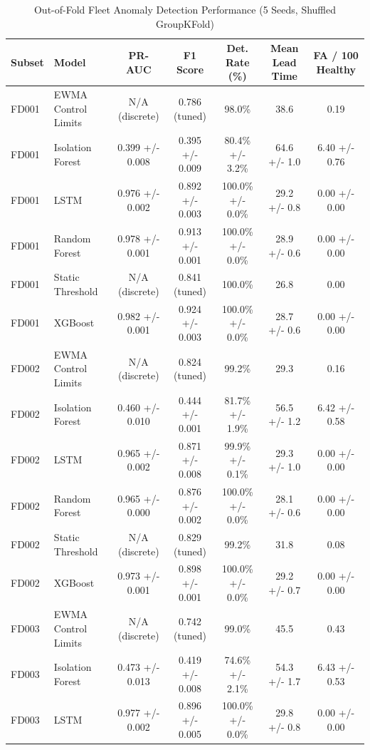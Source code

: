 \begin{table}[t!]
\centering
\small
\caption{Out-of-Fold Fleet Anomaly Detection Performance (5 Seeds, Shuffled GroupKFold)}
\label{tab:anomaly_metrics_oof}
\begin{tabular}{llccccc}
\toprule
\textbf{Subset} & \textbf{Model} & \textbf{PR-AUC} & \textbf{F1 Score} & \textbf{Det. Rate (\%)} & \textbf{Mean Lead Time} & \textbf{FA / 100 Healthy} \\
\midrule
FD001 & EWMA Control Limits & N/A (discrete) & 0.786 (tuned) & 98.0\% & 38.6 & 0.19 \\
FD001 & Isolation Forest & 0.399 +/- 0.008 & 0.395 +/- 0.009 & 80.4\% +/- 3.2\% & 64.6 +/- 1.0 & 6.40 +/- 0.76 \\
FD001 & LSTM & 0.976 +/- 0.002 & 0.892 +/- 0.003 & 100.0\% +/- 0.0\% & 29.2 +/- 0.8 & 0.00 +/- 0.00 \\
FD001 & Random Forest & 0.978 +/- 0.001 & 0.913 +/- 0.001 & 100.0\% +/- 0.0\% & 28.9 +/- 0.6 & 0.00 +/- 0.00 \\
FD001 & Static Threshold & N/A (discrete) & 0.841 (tuned) & 100.0\% & 26.8 & 0.00 \\
FD001 & XGBoost & 0.982 +/- 0.001 & 0.924 +/- 0.003 & 100.0\% +/- 0.0\% & 28.7 +/- 0.6 & 0.00 +/- 0.00 \\
\midrule
FD002 & EWMA Control Limits & N/A (discrete) & 0.824 (tuned) & 99.2\% & 29.3 & 0.16 \\
FD002 & Isolation Forest & 0.460 +/- 0.010 & 0.444 +/- 0.001 & 81.7\% +/- 1.9\% & 56.5 +/- 1.2 & 6.42 +/- 0.58 \\
FD002 & LSTM & 0.965 +/- 0.002 & 0.871 +/- 0.008 & 99.9\% +/- 0.1\% & 29.3 +/- 1.0 & 0.00 +/- 0.00 \\
FD002 & Random Forest & 0.965 +/- 0.000 & 0.876 +/- 0.002 & 100.0\% +/- 0.0\% & 28.1 +/- 0.6 & 0.00 +/- 0.00 \\
FD002 & Static Threshold & N/A (discrete) & 0.829 (tuned) & 99.2\% & 31.8 & 0.08 \\
FD002 & XGBoost & 0.973 +/- 0.001 & 0.898 +/- 0.001 & 100.0\% +/- 0.0\% & 29.2 +/- 0.7 & 0.00 +/- 0.00 \\
\midrule
FD003 & EWMA Control Limits & N/A (discrete) & 0.742 (tuned) & 99.0\% & 45.5 & 0.43 \\
FD003 & Isolation Forest & 0.473 +/- 0.013 & 0.419 +/- 0.008 & 74.6\% +/- 2.1\% & 54.3 +/- 1.7 & 6.43 +/- 0.53 \\
FD003 & LSTM & 0.977 +/- 0.002 & 0.896 +/- 0.005 & 100.0\% +/- 0.0\% & 29.8 +/- 0.8 & 0.00 +/- 0.00 \\

\end{tabular}
\end{table}
